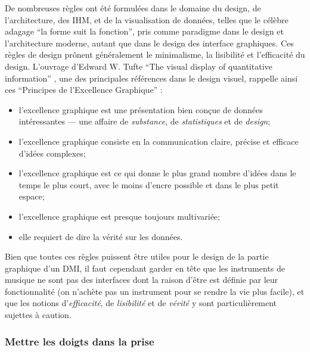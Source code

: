 \noindent De nombreuses règles ont été formulées dans le domaine du design, de l'architecture, des \gls{IHM}, et de la visualisation de données, telles que le célèbre adagage ``la forme suit la fonction'', pris comme paradigme dans le design et l'architecture moderne, autant que dans le design des interface graphiques. Ces règles de design prônent généralement le minimalisme, la lisibilité et l'efficacité du design. L'ouvrage d'Edward W. Tufte ``The visual display of quantitative information'' \cite{tufte_visual_2001}, une des principales références dans le design visuel, rappelle ainsi ces ``Principes de l'Excellence Graphique'' :
\vspace{-1em}
\begin{itemize}[noitemsep]
	\item l'excellence graphique est une présentation bien conçue de données intéressantes — une affaire de \textit{substance}, de \textit{statistiques} et de \textit{design};
	\item l'excellence graphique consiste en la communication claire, précise et efficace d'idées complexes;
	\item l'excellence graphique est ce qui donne le plus grand nombre d'idées dans le temps le plus court, avec le moins d'encre possible et dans le plus petit espace;
	\item l'excellence graphique est presque toujours multivariée;
	\item elle requiert de dire la vérité sur les données.
\end{itemize}

\noindent Bien que toutes ces règles puissent être utiles pour le design de la partie graphique d'un \gls{DMI}, il faut cependant garder en tête que les instruments de musique ne sont pas des interfaces dont la raison d'être est définie par leur fonctionnalité (on n'achète pas un instrument pour se rendre la vie plus facile), et que les notions d'\textit{efficacité}, de \textit{lisibilité} et de \textit{vérité} y sont particulièrement sujettes à caution.


\subsubsection{Mettre les doigts dans la prise}

